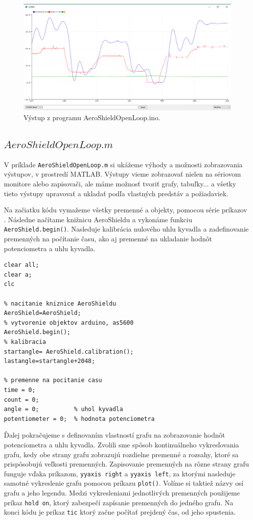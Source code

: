\begin{figure}[!tbh]
	\centering
	\includegraphics[width=120mm]{obr/VystupOLIDE.png}
	\caption{Výstup z programu AeroShieldOpenLoop.ino.}\label{OBRAZOK 3.1}
\end{figure}

\subsection{$AeroShieldOpenLoop.m$}

V príklade \verb|AeroShieldOpenLoop.m| si ukážeme výhody a možnosti zobrazovania výstupov, v prostredí MATLAB. Výstupy vieme zobrazovať nielen na sériovom monitore alebo zapisovači, ale máme možnosť tvoriť grafy, tabuľky... a všetky tieto výstupy upravovať a ukladať podľa vlastných predstáv a požiadaviek. 


Na začiatku kódu vymažeme všetky premenné a objekty, pomocou série príkazov . Následne načítame knižnicu AeroShieldu a vykonáme funkciu \verb|AeroShield.begin()|. Nasleduje kalibrácia nulového uhlu kyvadla a zadefinovanie premenných na počítanie času, ako aj premenné na ukladanie hodnôt potenciometra a uhlu kyvadla. 

\begin{lstlisting}[caption={AeroShield open loop inicializacia.},captionpos=b]
% vymazanie premennych a objektov 
clear all;
clear a;
clc 

% nacitanie kniznice AeroShieldu  
AeroShield=AeroShield;
% vytvorenie objektov arduino, as5600
AeroShield.begin();
% kalibracia
startangle= AeroShield.calibration(); 
lastangle=startangle+2048; 

% premenne na pocitanie casu
time = 0;
count = 0;
angle = 0;          % uhol kyvadla
potentiometer = 0;  % hodnota potenciometra
\end{lstlisting}

Ďalej pokračujeme s definovaním vlastností grafu na zobrazovanie hodnôt potenciometra a uhlu kyvadla. Zvolili sme spôsob kontinuálneho vykresľovania grafu, kedy obe strany grafu zobrazujú rozdielne premenné a rozsahy, ktoré sa prispôsobujú veľkosti premenných. Zapisovanie premenných na rôzne strany grafu funguje vďaka príkazom, \verb|yyaxis right| a \verb|yyaxis left|, za ktorými nasleduje samotné vykreslenie grafu pomocou príkazu \verb|plot()|. Volíme si taktiež názvy osí grafu a jeho legendu. Medzi vykresleniami jednotlivých premenných použijeme príkaz \verb|hold on|, ktorý zabezpečí zapísanie premenných do jedného grafu. Na konci kódu je príkaz \verb|tic| ktorý začne počítať prejdený čas, od jeho spustenia. 

